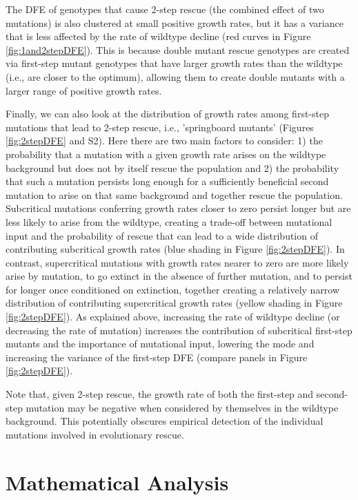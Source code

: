 \documentclass[9pt,twocolumn,twoside,lineno]{gsajnl}
\begin{document}
The DFE of genotypes that cause 2-step rescue (the combined effect of two mutations) is also clustered at small positive growth rates, but it has a variance that is less affected by the rate of wildtype decline (red curves in Figure \ref{fig:1and2stepDFE}).
This is because double mutant rescue genotypes are created via first-step mutant genotypes that have larger growth rates than the wildtype (i.e., are closer to the optimum), allowing them to create double mutants with a larger range of positive growth rates.

Finally, we can also look at the distribution of growth rates among first-step mutations that lead to 2-step rescue, i.e., 'springboard mutants' (Figures \ref{fig:2stepDFE} and S2).
Here there are two main factors to consider: 1) the probability that a mutation with a given growth rate arises on the wildtype background but does not by itself rescue the population and 2) the probability that such a mutation persists long enough for a sufficiently beneficial second mutation to arise on that same background and together rescue the population. 
Subcritical mutations conferring growth rates closer to zero persist longer but are less likely to arise from the wildtype, creating a trade-off between mutational input and the probability of rescue that can lead to a wide distribution of contributing subcritical growth rates (blue shading in Figure \ref{fig:2stepDFE}).
In contrast, supercritical mutations with growth rates nearer to zero are more likely arise by mutation, to go extinct in the absence of further mutation, and to persist for longer once conditioned on extinction, together creating a relatively narrow distribution of contributing supercritical growth rates (yellow shading in Figure \ref{fig:2stepDFE}).
As explained above, increasing the rate of wildtype decline (or decreasing the rate of mutation) increases the contribution of subcritical first-step mutants and the importance of mutational input, lowering the mode and increasing the variance of the first-step DFE (compare panels in Figure \ref{fig:2stepDFE}).

Note that, given 2-step rescue, the growth rate of both the first-step and second-step mutation may be negative when considered by themselves in the wildtype background. 
This potentially obscures empirical detection of the individual mutations involved in evolutionary rescue. 

\section{Mathematical Analysis}
\label{sec:analysis}
\end{document}
